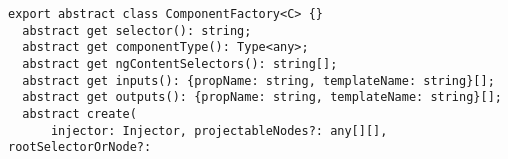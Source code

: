 \begin{verbatim}
export abstract class ComponentFactory<C> {}
  abstract get selector(): string;
  abstract get componentType(): Type<any>;
  abstract get ngContentSelectors(): string[];
  abstract get inputs(): {propName: string, templateName: string}[];
  abstract get outputs(): {propName: string, templateName: string}[];
  abstract create(
      injector: Injector, projectableNodes?: any[][], rootSelectorOrNode?:
\end{verbatim}
